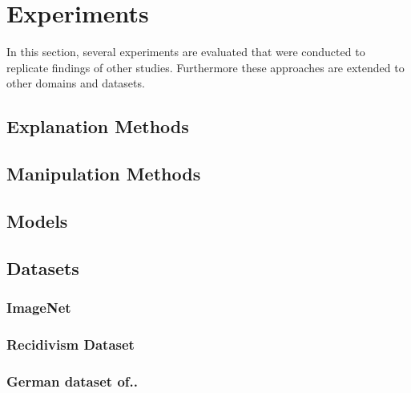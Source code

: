 \section{Experiments}
\label{sec:experiments}
In this section, several experiments are evaluated that were conducted to replicate findings of other studies. Furthermore these approaches are extended to other domains and datasets. 


\subsection{Explanation Methods}

\subsection{Manipulation Methods}

\subsection{Models}

\subsection{Datasets}

\subsubsection{ImageNet}
\subsubsection{Recidivism Dataset}
\subsubsection{German dataset of..}
